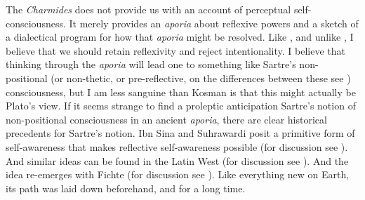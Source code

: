 The \emph{Charmides} does not provide us with an account of perceptual self-conscious\-ness. It merely provides an \emph{aporia} about reflexive powers and a sketch of a dialectical program for how that \emph{aporia} might be resolved. Like \citet{Kosman:2014aa}, and unlike \citet{McCabe:2007ss}, I believe that we should retain reflexivity and reject intentionality. I believe that thinking through the \emph{aporia} will lead one to something like Sartre's non-positional (or non-thetic, or pre-reflective, on the differences between these see \citealt{Webber:2002aa}) consciousness, but I am less sanguine than Kosman is that this might actually be Plato's view. If it seems strange to find a proleptic anticipation Sartre's notion of non-positional consciousness in an ancient \emph{aporia}, there are clear historical precedents for Sartre's notion. Ibn Sina and Suhrawardi posit a primitive form of self-awareness that makes reflective self-awareness possible (for discussion see \citealt{Kaukua:2014si}). And similar ideas can be found in the Latin West (for discussion see \citealt{Cory:2013oh}). And the idea re-emerges with Fichte (for discussion see \citealt{Heinrich:1966aa}). Like everything new on Earth, its path was laid down beforehand, and for a long time.

%
%



